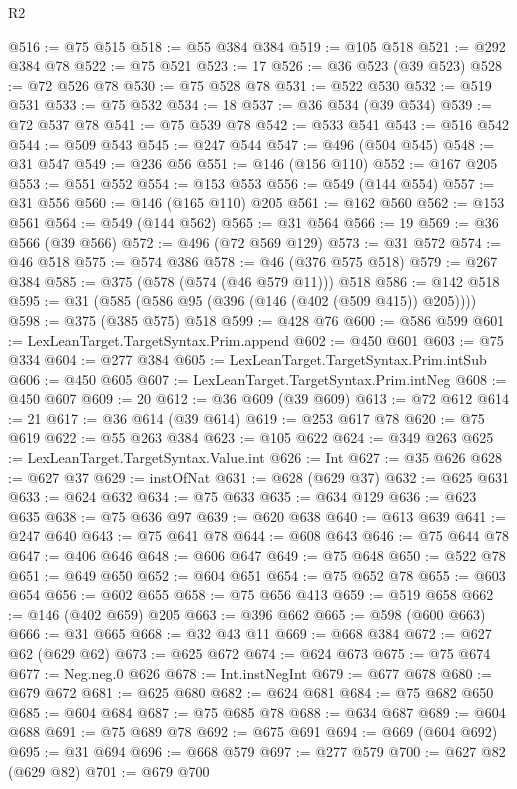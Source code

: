 \begin{lexlean}{R2}
\begin{coremodule}
@516 := @75 @515
@518 := @55 @384 @384
@519 := @105 @518
@521 := @292 @384 @78
@522 := @75 @521
@523 := 17
@526 := @36 @523 (@39 @523)
@528 := @72 @526 @78
@530 := @75 @528 @78
@531 := @522 @530
@532 := @519 @531
@533 := @75 @532
@534 := 18
@537 := @36 @534 (@39 @534)
@539 := @72 @537 @78
@541 := @75 @539 @78
@542 := @533 @541
@543 := @516 @542
@544 := @509 @543
@545 := @247 @544
@547 := @496 (@504 @545)
@548 := @31 @547
@549 := @236 @56
@551 := @146 (@156 @110)
@552 := @167 @205
@553 := @551 @552
@554 := @153 @553
@556 := @549 (@144 @554)
@557 := @31 @556
@560 := @146 (@165 @110) @205
@561 := @162 @560
@562 := @153 @561
@564 := @549 (@144 @562)
@565 := @31 @564
@566 := 19
@569 := @36 @566 (@39 @566)
@572 := @496 (@72 @569 @129)
@573 := @31 @572
@574 := @46 @518
@575 := @574 @386
@578 := @46 (@376 @575 @518)
@579 := @267 @384
@585 := @375 (@578 (@574 (@46 @579 @11))) @518
@586 := @142 @518
@595 := @31 (@585 (@586 @95 (@396 (@146 (@402 (@509 @415)) @205))))
@598 := @375 (@385 @575) @518
@599 := @428 @76
@600 := @586 @599
@601 := LexLeanTarget.TargetSyntax.Prim.append
@602 := @450 @601
@603 := @75 @334
@604 := @277 @384
@605 := LexLeanTarget.TargetSyntax.Prim.intSub
@606 := @450 @605
@607 := LexLeanTarget.TargetSyntax.Prim.intNeg
@608 := @450 @607
@609 := 20
@612 := @36 @609 (@39 @609)
@613 := @72 @612
@614 := 21
@617 := @36 @614 (@39 @614)
@619 := @253 @617 @78
@620 := @75 @619
@622 := @55 @263 @384
@623 := @105 @622
@624 := @349 @263
@625 := LexLeanTarget.TargetSyntax.Value.int
@626 := Int
@627 := @35 @626
@628 := @627 @37
@629 := instOfNat
@631 := @628 (@629 @37)
@632 := @625 @631
@633 := @624 @632
@634 := @75 @633
@635 := @634 @129
@636 := @623 @635
@638 := @75 @636 @97
@639 := @620 @638
@640 := @613 @639
@641 := @247 @640
@643 := @75 @641 @78
@644 := @608 @643
@646 := @75 @644 @78
@647 := @406 @646
@648 := @606 @647
@649 := @75 @648
@650 := @522 @78
@651 := @649 @650
@652 := @604 @651
@654 := @75 @652 @78
@655 := @603 @654
@656 := @602 @655
@658 := @75 @656 @413
@659 := @519 @658
@662 := @146 (@402 @659) @205
@663 := @396 @662
@665 := @598 (@600 @663)
@666 := @31 @665
@668 := @32 @43 @11
@669 := @668 @384
@672 := @627 @62 (@629 @62)
@673 := @625 @672
@674 := @624 @673
@675 := @75 @674
@677 := Neg.neg.{0} @626
@678 := Int.instNegInt
@679 := @677 @678
@680 := @679 @672
@681 := @625 @680
@682 := @624 @681
@684 := @75 @682 @650
@685 := @604 @684
@687 := @75 @685 @78
@688 := @634 @687
@689 := @604 @688
@691 := @75 @689 @78
@692 := @675 @691
@694 := @669 (@604 @692)
@695 := @31 @694
@696 := @668 @579
@697 := @277 @579
@700 := @627 @82 (@629 @82)
@701 := @679 @700

\end{coremodule}
\end{lexlean}
